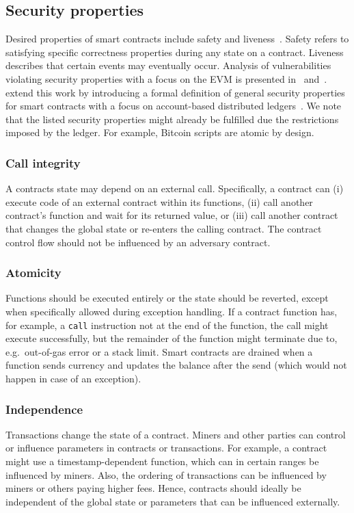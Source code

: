 \subsection{Security properties}
Desired properties of smart contracts include safety and liveness~\cite{Sergey2018}.
Safety refers to satisfying specific correctness properties during any state on a contract.
Liveness describes that certain events may eventually occur.
Analysis of vulnerabilities violating security properties with a focus on the EVM is presented in~\cite{Luu2016} and~\cite{Atzei2017}.
\citeauthor{Grishchenko2018} extend this work by introducing a formal definition of general security properties for smart contracts with a focus on account-based distributed ledgers~\cite{Grishchenko2018}. We note that the listed security properties might already be fulfilled due the restrictions imposed by the ledger. For example, Bitcoin scripts are atomic by design.

\subsubsection{Call integrity}
A contracts state may depend on an external call. Specifically, a contract can (i) execute code of an external contract within its functions, (ii) call another contract's function and wait for its returned value, or (iii) call another contract that changes the global state or re-enters the calling contract.
The contract control flow should not be influenced by an adversary contract.

\subsubsection{Atomicity}
Functions should be executed entirely or the state should be reverted, except when specifically allowed during exception handling.
If a contract function has, for example, a \texttt{call} instruction not at the end of the function, the call might execute successfully, but the remainder of the function might terminate due to, e.g.\ out-of-gas error or a stack limit. Smart contracts are drained when a function sends currency and updates the balance after the send (which would not happen in case of an exception).

\subsubsection{Independence}
Transactions change the state of a contract. Miners and other parties can control or influence parameters in contracts or transactions. For example, a contract might use a timestamp-dependent function, which can in certain ranges be influenced by miners. Also, the ordering of transactions can be influenced by miners or others paying higher fees. Hence, contracts should ideally be independent of the global state or parameters that can be influenced externally.

